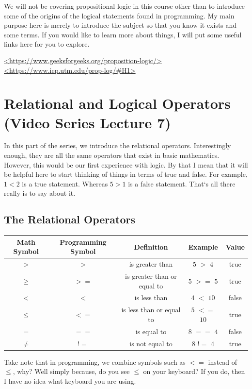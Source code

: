 \documentclass[11]{article}
\begin{document}
We will not be covering propositional logic in this course other than to introduce some of the origins of the logical statements found in programming. My main purpose here is merely to introduce the subject so that you know it exists and some terms. If you would like to learn more about things, I will put some useful links here for you to explore.

\url{<https://www.geeksforgeeks.org/proposition-logic/>}\\
\url {<https://www.iep.utm.edu/prop-log/#H1>}


\section{Relational and Logical Operators (Video Series Lecture 7)}
In this part of the series, we introduce the relational operators.  Interestingly enough, they are all the same operators that exist in basic mathematics. However, this would be our first experience with logic. By that I mean that it will be helpful here to start thinking of things in terms of true and false. For example, $1<2$ is a true statement. Whereas $5>1$ is a false statement. That`s all there really is to say about it.
\subsection{The Relational Operators}
\begin{center}
  \begin{tabular}{ | c | c | c | c | c |}
    \hline
    Math Symbol & Programming Symbol & Definition & Example & Value \\ \hline
    $>$ & $>$ & is greater than & $5$ $>$ $4$ & true \\ \hline
    $\geq$ & $>=$ & is greater than or equal to & $5$ $>=$ $5$ & true \\ \hline
    $<$ & $<$ & is less than & $4$ $<$ $10$ & false \\ \hline
    $\leq$ & $<=$ & is less than or equal to & $5$ $<=$ $10$ & true \\ \hline
    $=$ & $==$ & is equal to & $8$ $==$  $4$ & false \\ \hline
    $\neq$ & $!=$ & is not equal to & $8$ $!=$  $4$ & true \\ 
    \hline
  \end{tabular}
\end{center}

Take note that in programming, we combine symbols such as $<=$ instead of $\leq$, why? Well simply because, do you see $\leq$ on your keyboard? If you do, then I have no idea what keyboard you are using. \\
\end{document}
